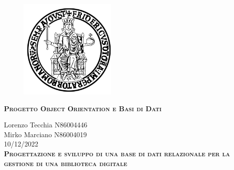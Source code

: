 \documentclass{report}
\begin{document}
\begin{center}
	
\end{center}
    \begin{figure}[htbp!]
        \begin{center}
            \includegraphics[width=.25\textwidth]{Immagini/FedericoII.png}
        \end{center}
    \end{figure}
    
    {\scshape\Large\bfseries Progetto Object Orientation e Basi di Dati}
    \begin{center}
        Lorenzo Tecchia N86004446 \\ Mirko Marciano N86004019 \\ 10/12/2022 \\
        
        
        
        
        \scshape\Large\bfseries Progettazione e sviluppo di una base di dati relazionale per la gestione di una biblioteca digitale
        
    \end{center}


    \newpage
    
    \tableofcontents
    \listoffigures
    \listoftables
    
    
    
    
    
    
    
\end{document}
